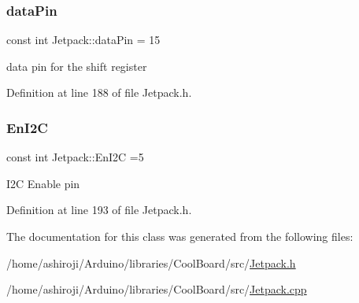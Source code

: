 \subsubsection{\texorpdfstring{data\+Pin}{dataPin}}
{\footnotesize\ttfamily const int Jetpack\+::data\+Pin = 15\hspace{0.3cm}{\ttfamily [private]}}

data pin for the shift register 

Definition at line 188 of file Jetpack.\+h.

\mbox{\label{class_jetpack_a81df984fb4cea98c71aa1a1cfcdfe814}} 
\subsubsection{\texorpdfstring{En\+I2C}{EnI2C}}
{\footnotesize\ttfamily const int Jetpack\+::\+En\+I2C =5\hspace{0.3cm}{\ttfamily [private]}}

I2C Enable pin 

Definition at line 193 of file Jetpack.\+h.



The documentation for this class was generated from the following files\+:\begin{DoxyCompactItemize}
\item 
/home/ashiroji/\+Arduino/libraries/\+Cool\+Board/src/\hyperlink{_jetpack_8h}{Jetpack.\+h}\item 
/home/ashiroji/\+Arduino/libraries/\+Cool\+Board/src/\hyperlink{_jetpack_8cpp}{Jetpack.\+cpp}\end{DoxyCompactItemize}
